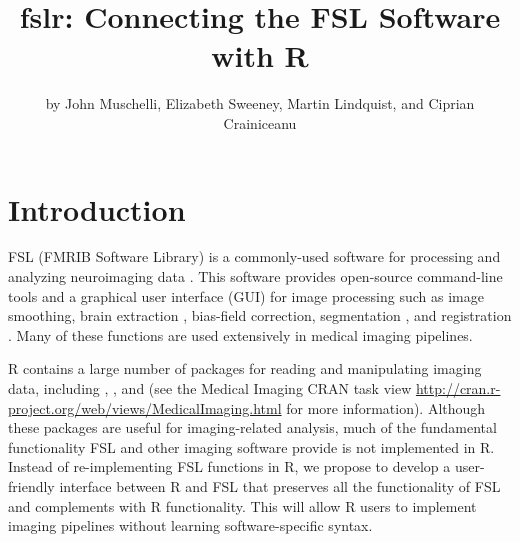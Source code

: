 
\title{fslr: Connecting the FSL Software with R}
\author{by John Muschelli, Elizabeth Sweeney, Martin Lindquist, and Ciprian Crainiceanu}

\maketitle









\section{Introduction}
\label{sec:intro}

FSL (FMRIB Software Library) is a commonly-used software for processing and analyzing neuroimaging data \citep{jenkinson_fsl_2012}.  This software provides open-source command-line tools and a graphical user interface (GUI) for image processing such as image smoothing, brain extraction \citep{smith_fast_2002}, bias-field correction, segmentation \citep{zhang_segmentation_2001}, and registration \citep{jenkinson_global_2001, jenkinson_improved_2002}.    Many of these functions are used extensively in medical imaging pipelines.  

R contains a large number of packages for reading and manipulating imaging data, including  \citep{bordier_temporal_2011},  \citep{modat_rniftyreg:_2013}, and  \citep{tabelow_statistical_2011} (see the Medical Imaging CRAN task view \url{http://cran.r-project.org/web/views/MedicalImaging.html} for more information).  Although these packages are useful for imaging-related analysis, much of the fundamental functionality FSL and other imaging software provide is not implemented in R.  Instead of re-implementing FSL functions in R, we propose to develop a user-friendly interface between R and FSL that preserves all the functionality of FSL and complements with R functionality. This will allow
R users to implement imaging pipelines without learning software-specific syntax.  

